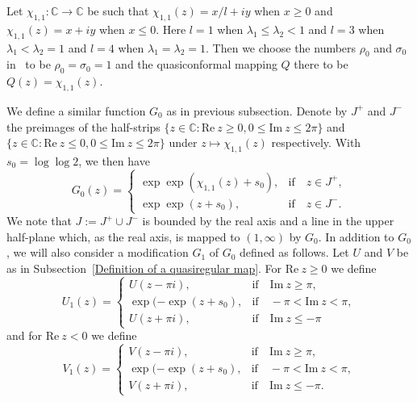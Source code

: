 \documentclass[12pt]{amsart}
\numberwithin{equation}{section}
\begin{document}
Let $\chi_{1,1}:\mathbb{C}\to\mathbb{C}$ be such that $\chi_{1,1}(z)=x/l+iy$ when $x\geq 0$ and $\chi_{1,1}(z)=x+iy$ when $x\leq 0$. Here $l=1$ when $\lambda_1\leq \lambda_2<1$ and $l=3$ when $\lambda_1<\lambda_2=1$ and $l=4$ when $\lambda_1=\lambda_2=1$. Then we choose the numbers $\rho_0$ and $\sigma_0$ in~\cite[Section~5]{Bergweilereremenko2019} to be $\rho_0=\sigma_0=1$ and the quasiconformal mapping $Q$ there to be $Q(z)=\chi_{1,1}(z)$.

We define a similar function $G_0$ as in previous subsection. Denote by $J^{+}$ and $J^{-}$ the preimages of the half-strips $\{z\in \mathbb{C}:\text{Re}\ z\geq0, 0\leq \text{Im}\ z\leq 2\pi\}$ and $\{z\in \mathbb{C}:\text{Re}\ z\leq0, 0\leq \text{Im}\ z\leq 2\pi\}$ under $z\mapsto \chi_{1,1}(z)$ respectively. With $s_0=\log\log 2$, we then have
\begin{equation}\label{big-integer-order-1}
G_0(z)=
\left\{
  \begin{array}{ll}
    \exp\exp(\chi_{1,1}(z)+s_0), & \text{if} \quad  z\in J^{+}, \\
    \exp\exp(z+s_0),       & \text{if} \quad  z\in J^{-}.
  \end{array}
\right.
\end{equation}
We note that $J:=J^{+}\cup J^{-}$ is bounded by the real axis and a line in the upper half-plane which, as the real axis, is mapped to $(1,\infty)$ by $G_0$. In addition to $G_0$, we will also consider a modification $G_1$ of $G_0$ defined as follows. Let $U$ and $V$ be as in Subsection~\ref{Definition of a quasiregular map}. For $\text{Re}\ z\geq 0$ we define
\begin{equation*}%
U_1(z)=
\left\{
  \begin{array}{lll}
    U(z-\pi i),         & \text{if} \quad        \text{Im}\ z\geq \pi, \\
    \exp(-\exp(z+s_0),  & \text{if} \quad -\pi < \text{Im}\ z <\pi, \\
    U(z+\pi i),         & \text{if} \quad         \text{Im}\ z\leq -\pi
  \end{array}
\right.
\end{equation*}
and for $\text{Re}\ z<0$ we define
\begin{equation*}%
V_1(z)=
\left\{
  \begin{array}{lll}
    V(z-\pi i),         & \text{if} \quad \text{Im}\ z\geq \pi, \\
    \exp(-\exp(z+s_0),  & \text{if} \quad -\pi < \text{Im}\ z <\pi, \\
    V(z+\pi i),         & \text{if} \quad \text{Im}\ z\leq -\pi.
  \end{array}
\right.
\end{equation*}
\end{document}
